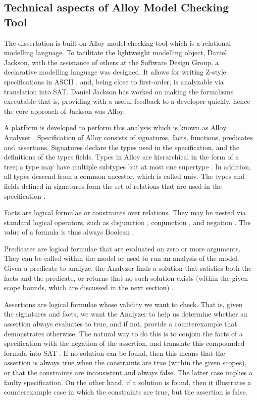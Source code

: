\documentclass[a4paper,12pt]{report}
\begin{document}
\begin{onehalfspacing}
 \chapter{Technical aspects of Alloy Model Checking Tool}
 \label{Intro to Alloy}
The dissertation is built on Alloy model checking tool which is a relational modelling language. To facilitate the lightweight modelling object, Daniel Jackson, with the assistance of others at the Software Design Group, a declarative modelling language was designed. It allows for writing Z-style specifications in ASCII \cite{J.M.Spivey1989}, and, being close to first-order, is analyzable via translation into SAT. Daniel Jackson has worked on making the formalisms executable that is, providing  with a useful feedback to a developer quickly. hence the core approach of Jackson was Alloy.

 A platform is developed to perform this analysis which is known as Alloy Analyser \cite{Yeung2005}. 
Specification of Alloy consists of signatures, facts, functions, predicates and assertions. Signatures declare the types used in the specification, and the definitions of the types fields. Types in Alloy are hierarchical in the form of a tree; a type may have multiple subtypes but at most one supertype \cite{DanielJackson2004}. In addition, all types descend from a common ancestor, which is called univ. The types and fields defined in signatures form the set of relations that are used in the specification \cite{Yeung2005}.

Facts are logical formulae or constraints over relations. They may be nested via standard logical operators, such as disjunction , conjunction , and negation . The value of a formula is thus always Boolean \cite{Yeung2005}.

Predicates are logical formulae that are evaluated on zero or more arguments. They can be called within the model or used to run an analysis of the model. Given a predicate to analyze, the Analyzer finds a solution that satisfies both the facts and the predicate, or returns that no such solution exists (within the given scope bounds, which are discussed in the next section) \cite{Yeung2005}.

Assertions are logical formulae whose validity we want to check. That is, given the signatures and facts, we want the Analyzer to help us determine whether an assertion always evaluates to true, and if not, provide a counterexample that demonstrates otherwise. The natural way to do this is to conjoin the facts of a specification with the negation of the assertion, and translate this compounded formula into SAT \cite{O.Strichman}. If no solution can be found, then this means that the assertion is always true when the constraints are true (within the given scopes), or that the constraints are inconsistent and always false. The latter case implies a faulty specification. On the other hand, if a solution is found, then it illustrates a counterexample case in which the constraints are true, but the assertion is false. 


\end{onehalfspacing}
\end{document}
